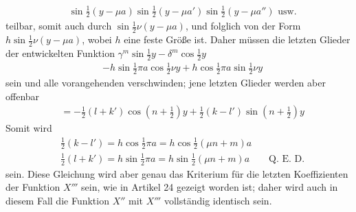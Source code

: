 \[
\begin{aligned}
&\sin\tfrac12(y-\mu a)\sin\tfrac12(y-\mu a')\sin\tfrac12(y-\mu a'')\text{ usw.}
\end{aligned}
\]
teilbar, somit auch durch $\sin\tfrac12\nu(y-\mu a)$, und folglich von der Form $h\sin\tfrac12\nu(y-\mu a)$, wobei $h$ eine feste Größe ist. Daher müssen die letzten Glieder der entwickelten Funktion $\gamma^m\sin\tfrac12y-\delta^m\cos\tfrac12y$
\[
\begin{aligned}
&-h\sin\tfrac12\pi a\cos\tfrac12\nu y+h\cos\tfrac12\pi a\sin\tfrac12\nu y
\end{aligned}
\]
sein und alle vorangehenden verschwinden; jene letzten Glieder werden aber offenbar
\[
\begin{aligned}
&=-\tfrac12(l+k')\cos(n+\tfrac12)y+\tfrac12(k-l')\sin(n+\tfrac12)y
\end{aligned}
\]
Somit wird
\[
\begin{aligned}
&\tfrac12(k-l')=h\cos\tfrac12\pi a=h\cos\tfrac12(\mu n+m)a\\[5pt]
&\tfrac12(l+k')=h\sin\tfrac12\pi a=h\sin\tfrac12(\mu n+m)a\qquad\text{Q.~E.~D.}
\end{aligned}
\]
sein. Diese Gleichung wird aber genau das Kriterium für die letzten Koeffizienten der Funktion
$X'''$ sein, wie in Artikel 24 gezeigt worden ist; daher wird auch in diesem Fall die Funktion $X''$ mit $X'''$
vollständig identisch sein.

